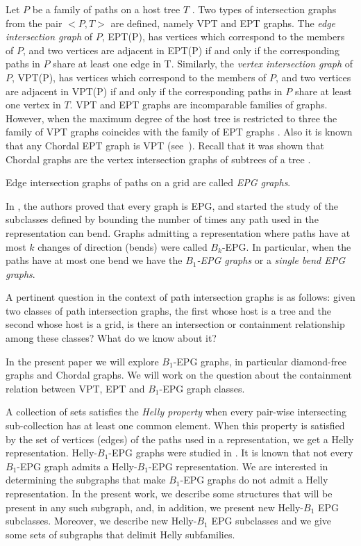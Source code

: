 \documentclass[9pt]{entcs}
\begin{document}
 Let $P$ be a family of paths on a host tree $T$ . Two types of intersection graphs from the pair $<P,T>$ are defined, namely VPT and EPT graphs.
The \textit{edge intersection graph} of $P$, EPT(P), has vertices which correspond to the members of $P$, and two vertices are adjacent in EPT(P) if and only if the corresponding paths in $P$ share at least one edge in T. Similarly, the \textit{vertex intersection graph} of $P$, VPT(P), has vertices which correspond to the members of $P$, and two vertices are adjacent in VPT(P) if and only if the corresponding paths in $P$ share at least one vertex in $T$.
%
VPT and EPT graphs are incomparable families of graphs. However, when the maximum degree of the host tree is restricted to three the family of
VPT graphs coincides with the family of EPT graphs \cite{golumbic1985edge%
}. Also it is known that any Chordal EPT graph is VPT (see~\cite{syslo1985triangulated}). Recall that it was shown that Chordal graphs are the vertex intersection graphs of subtrees of a tree \cite{gavril1974intersection}.

Edge intersection graphs of paths on a grid are called \textit{EPG graphs}. 

In \cite{golumbic2009}, the authors proved that every graph is EPG, and started the study of the subclasses
defined by bounding the number of times any path used in the representation can bend.  Graphs admitting a representation
where  paths  have at most $k$ changes of direction  (bends) were called $B_k$-EPG. 
 In particular, when the paths have at most one bend we have the \textit{ $B_1$-EPG graphs} or a \textit{single bend EPG graphs}.

 A pertinent question in the context of path intersection graphs is as follows: given two classes of path intersection graphs,
 the first whose host is a tree and the second whose host is a grid,  is there an intersection or containment relationship among these classes? What do we know about it?

In the present paper we will explore $B_1$-EPG graphs, in particular diamond-free graphs and Chordal graphs. We will work on the question about the containment
relation between  VPT, EPT and $B_1$-EPG graph classes.


 A collection  of sets satisfies the \textit{Helly property} when every pair-wise intersecting sub-collection  has at least one common element. When this property
 is satisfied by the set of vertices (edges) of the paths used in a representation, we get a Helly representation.  Helly-$B_1$-EPG graphs were studied
 in \cite{bornstein2019complexity}.                                     
It is known that not every $B_1$-EPG graph admits a Helly-$B_1$-EPG representation. We are interested in determining the subgraphs that make
$B_1$-EPG graphs do not admit a Helly representation. In the present work, we describe some structures that will be present in any such subgraph,
and, in addition, we present new  Helly-$B_1$ EPG  subclasses.
Moreover,  we  describe new  Helly-$B_1$ EPG  subclasses %
and we give some sets of subgraphs that delimit Helly subfamilies.   
\end{document}
